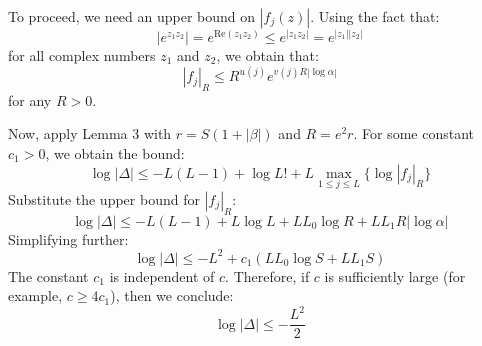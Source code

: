 \documentclass{article}
\newenvironment{proofbox}
  {\begin{mdframed}[linewidth=1pt,linecolor=black,backgroundcolor=white]\noindent\ignorespaces}
  {\end{mdframed}}
\begin{document}
\begin{proofbox}
To proceed, we need an upper bound on $|f_j(z)|$. Using the fact that:
\[
|e^{z_1 z_2}| = e^{\text{Re}(z_1 z_2)} \leq e^{|z_1 z_2|} = e^{|z_1||z_2|}
\]
for all complex numbers $z_1$ and $z_2$, we obtain that:
\[
|f_j|_R \leq R^{u(j)} e^{v(j) R |\log \alpha|}
\]
for any $R > 0$.

Now, apply Lemma 3 with $r = S(1 + |\beta|)$ and $R = e^2 r$. For some constant $c_1 > 0$, we obtain the bound:
\[
\log |\Delta| \leq -L(L - 1) + \log L! + L \max_{1 \leq j \leq L} \{ \log |f_j|_R \}
\]
Substitute the upper bound for $|f_j|_R$:
\[
\log |\Delta| \leq -L(L - 1) + L \log L + L L_0 \log R + L L_1 R |\log \alpha|
\]
Simplifying further:
\[
\log |\Delta| \leq -L^2 + c_1 (L L_0 \log S + L L_1 S)
\]
The constant $c_1$ is independent of $c$. Therefore, if $c$ is sufficiently large (for example, $c \geq 4c_1$), then we conclude:
\[
\log |\Delta| \leq -\frac{L^2}{2}
\]


\end{proofbox}
\end{document}
